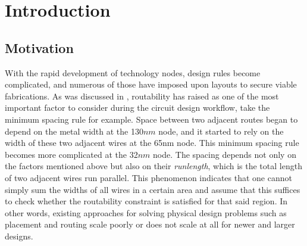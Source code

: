 \section{Introduction}
\label{sec:intro}
\subsection{Motivation}
With the rapid development of technology nodes, design rules become complicated, and numerous of those have imposed upon layouts to secure viable fabrications.
As was discussed in \cite{theimportance}, routability has raised as one of the most important factor to consider during the circuit design workflow, take the minimum spacing rule for example.
Space between two adjacent routes began to depend on the metal width at the 130$nm$ node, and it started to rely on the width of these two adjacent wires at the 65nm node.
This minimum spacing rule becomes more complicated at the 32$nm$ node.
The spacing depends not only on the factors mentioned above but also on their \textit{runlength}, which is the total length of two adjacent wires run parallel.
This phenomenon indicates that one cannot simply sum the widths of all wires in a certain area and assume that this suffices to check whether the routability constraint is satisfied for that said region.
In other words, existing approaches for solving physical design problems such as placement and routing scale poorly or does not scale at all for newer and larger designs.


